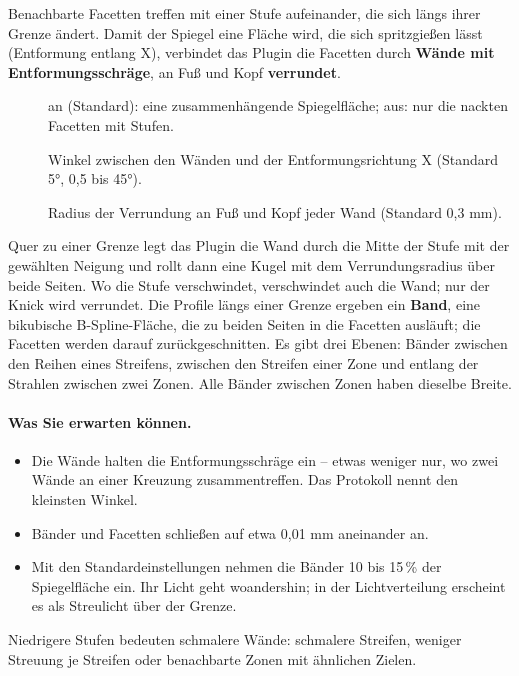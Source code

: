 Benachbarte Facetten treffen mit einer Stufe aufeinander, die sich längs ihrer Grenze ändert. Damit
der Spiegel eine Fläche wird, die sich spritzgießen lässt (Entformung entlang X), verbindet das Plugin
die Facetten durch \textbf{Wände mit Entformungsschräge}, an Fuß und Kopf \textbf{verrundet}.

\begin{description}
  \item[] an (Standard): eine zusammenhängende Spiegelfläche; aus: nur die
    nackten Facetten mit Stufen.
  \item[] Winkel zwischen den Wänden und der Entformungsrichtung X (Standard
    \ang{5}, 0,5 bis \ang{45}).
  \item[] Radius der Verrundung an Fuß und Kopf jeder Wand (Standard 0,3 mm).
\end{description}

Quer zu einer Grenze legt das Plugin die Wand durch die Mitte der Stufe mit der gewählten Neigung und
rollt dann eine Kugel mit dem Verrundungsradius über beide Seiten. Wo die Stufe verschwindet,
verschwindet auch die Wand; nur der Knick wird verrundet. Die Profile längs einer Grenze ergeben ein
\textbf{Band}, eine bikubische B-Spline-Fläche, die zu beiden Seiten in die Facetten ausläuft; die
Facetten werden darauf zurückgeschnitten. Es gibt drei Ebenen: Bänder zwischen den Reihen eines
Streifens, zwischen den Streifen einer Zone und entlang der Strahlen zwischen zwei Zonen. Alle Bänder
zwischen Zonen haben dieselbe Breite.

\paragraph{Was Sie erwarten können.}
\begin{itemize}
  \item Die Wände halten die Entformungsschräge ein -- etwas weniger nur, wo zwei Wände an einer
    Kreuzung zusammentreffen. Das Protokoll nennt den kleinsten Winkel.
  \item Bänder und Facetten schließen auf etwa 0,01 mm aneinander an.
  \item Mit den Standardeinstellungen nehmen die Bänder 10 bis 15\,\% der Spiegelfläche ein. Ihr
    Licht geht woandershin; in der Lichtverteilung erscheint es als Streulicht über der Grenze.
\end{itemize}

Niedrigere Stufen bedeuten schmalere Wände: schmalere Streifen, weniger Streuung je Streifen oder
benachbarte Zonen mit ähnlichen Zielen.

